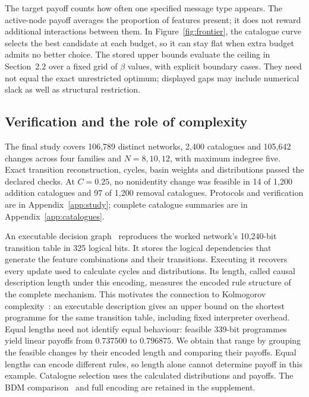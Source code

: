 \documentclass[11pt,a4paper]{article}
\begin{document}
The target payoff counts how often one specified message type appears.
The active-node payoff averages the proportion of features present;
it does not reward additional interactions between them.
In Figure~\ref{fig:frontier}, the catalogue curve selects the best candidate
at each budget, so it can stay flat when extra budget admits no better
choice. The stored upper bounds evaluate the ceiling in Section~2.2
over a fixed grid of $\beta$ values, with explicit boundary cases.
They need not equal the exact unrestricted optimum; displayed gaps may
include numerical slack as well as structural restriction.

\subsection{Verification and the role of complexity}
The final study covers 106,789 distinct networks, 2,400 catalogues and
105,642 changes across four families and $N=8,10,12$, with maximum
indegree five. Exact transition reconstruction, cycles, basin weights
and distributions passed the declared checks. At $C=0.25$, no nonidentity
change was feasible in 14 of 1,200 addition catalogues and 97 of 1,200
removal catalogues. Protocols and verification are in
Appendix~\ref{app:study}; complete catalogue summaries are in
Appendix~\ref{app:catalogues}.

An executable decision graph~\cite{bryant} reproduces the worked network's
10,240-bit transition table in 325 logical bits. It stores the logical
dependencies that generate the feature combinations and their transitions.
Executing it recovers every update used to calculate cycles and
distributions. Its length, called causal description length under this
encoding, measures the encoded rule structure of the complete mechanism.
This motivates the connection to Kolmogorov complexity~\cite{kolmogorov}:
an executable description gives an upper bound on the shortest programme
for the same transition table, including fixed interpreter overhead.
Equal lengths need not identify equal behaviour: feasible 339-bit
programmes yield linear payoffs from $0.737500$ to $0.796875$.
We obtain that range by grouping the feasible changes by their encoded
length and comparing their payoffs. Equal lengths can encode different
rules, so length alone cannot determine payoff in this example.
Catalogue selection uses the calculated distributions and payoffs.
The BDM comparison~\cite{bdm} and full encoding are retained in the supplement.
\end{document}
